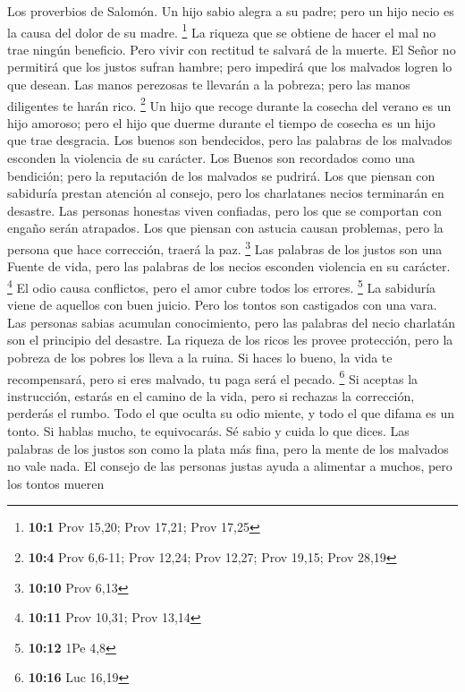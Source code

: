  Los proverbios de Salomón. Un hijo sabio alegra a su padre;
pero un hijo necio es la causa del dolor de su madre. \footnote{\textbf{10:1}
  Prov 15,20; Prov 17,21; Prov 17,25}  La riqueza que se
obtiene de hacer el mal no trae ningún beneficio. Pero vivir con
rectitud te salvará de la muerte.  El Señor no permitirá que
los justos sufran hambre; pero impedirá que los malvados logren lo que
desean.  Las manos perezosas te llevarán a la pobreza; pero
las manos diligentes te harán rico. \footnote{\textbf{10:4} Prov 6,6-11;
  Prov 12,24; Prov 12,27; Prov 19,15; Prov 28,19}  Un hijo
que recoge durante la cosecha del verano es un hijo amoroso; pero el
hijo que duerme durante el tiempo de cosecha es un hijo que trae
desgracia.  Los buenos son bendecidos, pero las palabras de
los malvados esconden la violencia de su carácter.  Los
Buenos son recordados como una bendición; pero la reputación de los
malvados se pudrirá.  Los que piensan con sabiduría prestan
atención al consejo, pero los charlatanes necios terminarán en desastre.
 Las personas honestas viven confiadas, pero los que se
comportan con engaño serán atrapados.  Los que piensan con
astucia causan problemas, pero la persona que hace corrección, traerá la
paz. \footnote{\textbf{10:10} Prov 6,13}  Las palabras de
los justos son una Fuente de vida, pero las palabras de los necios
esconden violencia en su carácter. \footnote{\textbf{10:11} Prov 10,31;
  Prov 13,14}  El odio causa conflictos, pero el amor cubre
todos los errores. \footnote{\textbf{10:12} 1Pe 4,8}  La
sabiduría viene de aquellos con buen juicio. Pero los tontos son
castigados con una vara.  Las personas sabias acumulan
conocimiento, pero las palabras del necio charlatán son el principio del
desastre.  La riqueza de los ricos les provee protección,
pero la pobreza de los pobres los lleva a la ruina.  Si
haces lo bueno, la vida te recompensará, pero si eres malvado, tu paga
será el pecado. \footnote{\textbf{10:16} Luc 16,19}  Si
aceptas la instrucción, estarás en el camino de la vida, pero si
rechazas la corrección, perderás el rumbo.  Todo el que
oculta su odio miente, y todo el que difama es un tonto. 
Si hablas mucho, te equivocarás. Sé sabio y cuida lo que dices.
 Las palabras de los justos son como la plata más fina,
pero la mente de los malvados no vale nada.  El consejo de
las personas justas ayuda a alimentar a muchos, pero los tontos mueren
